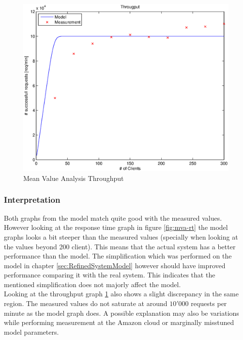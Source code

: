 \documentclass[a4paper]{article}
\begin{document}

\begin{figure}[H]
	\begin{center}
    \includegraphics[scale=0.6]{../plots-ms2-mg/mva-tp.eps}
  \end{center}
  \caption{Mean Value Analysis Throughput}
  \label{fig:mva-tp}
\end{figure}



\subsubsection{Interpretation}
Both graphs from the model match quite good with the measured values. However looking at the response time graph in figure \ref{fig:mva-rt} the model graphs looks a bit steeper than the measured values (specially when looking at the values beyond 200 client). This means that the actual system has a better performance than the model. The simplification which was performed on the model in chapter \ref{sec:RefinedSystemModel} however should have improved performance comparing it with the real system. This indicates that the mentioned simplification does not majorly affect the model.\\

Looking at the throughput graph \ref{fig:mva-tp} also shows a slight discrepancy in the same region. The measured values do not saturate at around $10'000$ requests per minute as the model graph does. A possible explanation may also be variations while performing measurement at the Amazon cloud or marginally misstuned model parameters.
\end{document}
